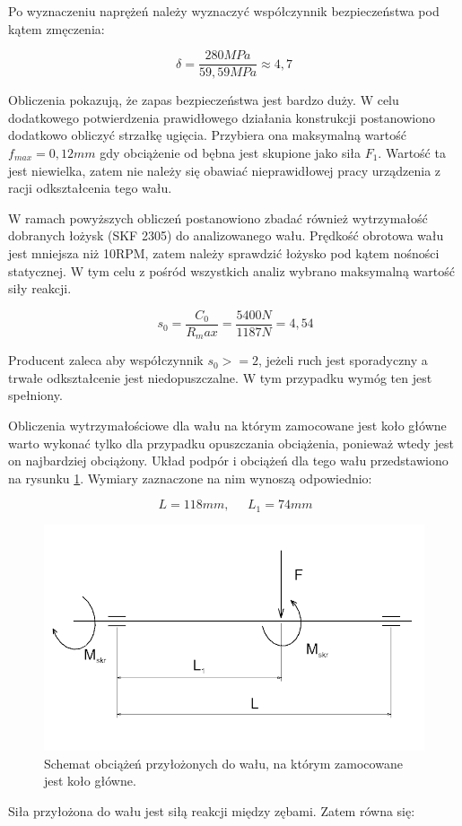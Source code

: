 			Po wyznaczeniu naprężeń należy wyznaczyć współczynnik bezpieczeństwa pod kątem zmęczenia:
			
			\begin{equation}
			\delta=\frac{280 MPa}{59,59 MPa} \approx 4,7
			\end{equation}
			
			Obliczenia pokazują, że zapas bezpieczeństwa jest bardzo duży. 
			W celu dodatkowego potwierdzenia prawidłowego działania konstrukcji postanowiono dodatkowo obliczyć strzałkę ugięcia.
			Przybiera ona maksymalną wartość $f_{max}=0,12 mm$ gdy obciążenie od bębna jest skupione jako siła $F_1$.
			Wartość ta jest niewielka, zatem nie należy się obawiać nieprawidłowej pracy urządzenia z racji odkształcenia tego wału.
			
			W ramach powyższych obliczeń postanowiono zbadać również wytrzymałość dobranych łożysk (SKF 2305) do analizowanego wału.
			Prędkość obrotowa wału jest mniejsza niż 10RPM, zatem należy sprawdzić łożysko pod kątem nośności statycznej.
			W tym celu z pośród wszystkich analiz wybrano maksymalną wartość siły reakcji.
			
			\begin{equation}
			\ s_0= \frac{C_0}{R_max}=\frac{5400 N}{1187 N}=4,54
			\end{equation}
			
			Producent zaleca aby współczynnik $s_0 >=2$, jeżeli ruch jest sporadyczny a trwałe odkształcenie jest niedopuszczalne.
			W tym przypadku wymóg ten jest spełniony.
			
			
			Obliczenia wytrzymałościowe dla wału na którym zamocowane jest koło główne warto wykonać tylko dla przypadku opuszczania obciążenia, ponieważ wtedy jest on najbardziej obciążony.
			Układ podpór i obciążeń dla tego wału przedstawiono na rysunku \ref{fig::shaft_gear}.
			Wymiary zaznaczone na nim wynoszą odpowiednio:
			
			\begin{equation}
			\ L=118mm, \;\;\;\;\; L_1 =74mm
			\end{equation}
			
			\begin{figure}[th]
				\centering
				\includegraphics[width=0.9\linewidth]{Projekt/shaft_gear}
				\caption{Schemat obciążeń przyłożonych do wału, na którym zamocowane jest koło główne.} 
				\label{fig::shaft_gear}
			\end{figure}
		Siła przyłożona do wału jest siłą reakcji między zębami.
		Zatem równa się:
		
